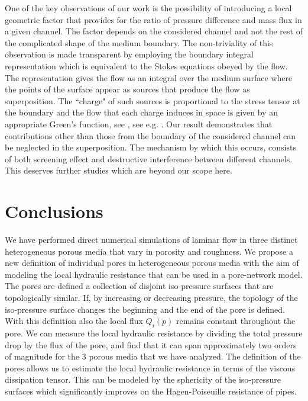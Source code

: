 \documentclass[draft]{agujournal2019}
\begin{document}
One of the key observations of our work is the possibility of introducing a local geometric factor that provides for the ratio of pressure difference and mass flux in a given channel. The factor depends on the considered channel and not the rest of the complicated shape of the medium boundary. The non-triviality of this observation is made transparent by employing the boundary integral representation which is equivalent to the Stokes equations obeyed by the flow. The representation gives the flow as an integral over the medium surface where the points of the surface appear as sources that produce the flow as superposition. The ``charge" of such sources is proportional to the stress tensor at the boundary and the flow that each charge induces in space is given by an appropriate Green's function, see , see e.g. \cite{pozrikidis_boundary_1992}. Our result demonstrates that contributions other than those from the boundary of the considered channel can be neglected in the superposition. The mechanism by which this occurs, consists of both screening effect and destructive interference between different channels. This deserves further studies which are beyond our scope here.





\section{Conclusions}
We have performed direct numerical simulations of laminar flow in three distinct heterogeneous porous media that vary in porosity and roughness. We propose a new definition of individual pores in heterogeneous porous media with the aim of modeling the local hydraulic resistance that can be used in a pore-network model. The pores are defined a collection of disjoint iso-pressure surfaces that are topologically similar. If, by increasing or decreasing pressure, the topology of the iso-pressure surface changes the beginning and the end of the pore is defined. With this definition also the local flux $Q_i(p)$ remains constant throughout the pore. We can measure the local hydraulic resistance by dividing the total pressure drop by the flux of the pore, and find that it can span approximately two orders of magnitude for the 3 porous media that we have analyzed. The definition of the pores allows us to estimate the local hydraulic resistance in terms of the viscous dissipation tensor. This can be modeled by the sphericity of the iso-pressure surfaces which significantly improves on the Hagen-Poiseuille resistance of pipes. 









\end{document}
